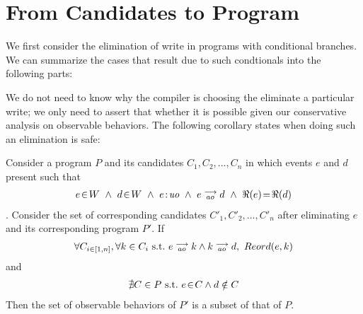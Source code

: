 \section{From Candidates to Program}

    We first consider the elimination of write in programs with conditional branches. We can summarize the cases that result due to such condtionals into the following parts:


    We do not need to know why the compiler is choosing the eliminate a particular write; we only need to assert that whether it is possible given our conservative analysis on observable behaviors. The following corollary states when doing such an elimination is safe: 

    \begin{corollary}
        Consider a program $P$ and its candidates $C_1, C_2, ... , C_n$ in which events $e$ and $d$ present such that 
        \begin{align*}
            \event{e}{W} \ \wedge \ \event{d}{W} \ \wedge \ \et{e}{uo} \ \wedge \ \reln{e}{ao}{d} \ \wedge \ \Re(e)\!=\!\Re(d)
        \end{align*} . 
        Consider the set of corresponding candidates $C'_1, C'_2, ... , C'_n$ after eliminating $e$ and its corresponding program $P'$. If
        \begin{align*}
            \forall C_{i \in [1,n]}, \forall k \in C_i \ \text{s.t.} \ \reln{e}{ao}{k} \wedge \reln{k}{ao}{d}, \    
            Reord(e,k)  
        \end{align*}
        and
        \begin{align*}
            \nexists C \in P \ \text{s.t.} \ e\!\in\!C \wedge d \notin C
        \end{align*}
        Then the set of observable behaviors of $P'$ is a subset of that of $P$.
    \end{corollary}

